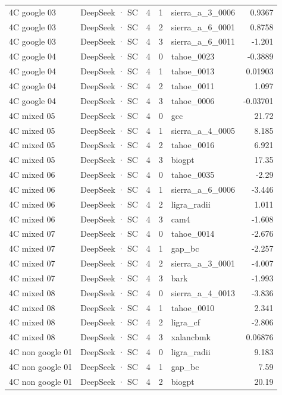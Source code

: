 \begin{tabular}{llrrlr}
4C google 03 & DeepSeek · SC & 4 & 1 & sierra\_a\_3\_0006 & 0.9367 \\
4C google 03 & DeepSeek · SC & 4 & 2 & sierra\_a\_6\_0001 & 0.8758 \\
4C google 03 & DeepSeek · SC & 4 & 3 & sierra\_a\_6\_0011 & -1.201 \\
4C google 04 & DeepSeek · SC & 4 & 0 & tahoe\_0023 & -0.3889 \\
4C google 04 & DeepSeek · SC & 4 & 1 & tahoe\_0013 & 0.01903 \\
4C google 04 & DeepSeek · SC & 4 & 2 & tahoe\_0011 & 1.097 \\
4C google 04 & DeepSeek · SC & 4 & 3 & tahoe\_0006 & -0.03701 \\
4C mixed 05 & DeepSeek · SC & 4 & 0 & gcc & 21.72 \\
4C mixed 05 & DeepSeek · SC & 4 & 1 & sierra\_a\_4\_0005 & 8.185 \\
4C mixed 05 & DeepSeek · SC & 4 & 2 & tahoe\_0016 & 6.921 \\
4C mixed 05 & DeepSeek · SC & 4 & 3 & biogpt & 17.35 \\
4C mixed 06 & DeepSeek · SC & 4 & 0 & tahoe\_0035 & -2.29 \\
4C mixed 06 & DeepSeek · SC & 4 & 1 & sierra\_a\_6\_0006 & -3.446 \\
4C mixed 06 & DeepSeek · SC & 4 & 2 & ligra\_radii & 1.011 \\
4C mixed 06 & DeepSeek · SC & 4 & 3 & cam4 & -1.608 \\
4C mixed 07 & DeepSeek · SC & 4 & 0 & tahoe\_0014 & -2.676 \\
4C mixed 07 & DeepSeek · SC & 4 & 1 & gap\_bc & -2.257 \\
4C mixed 07 & DeepSeek · SC & 4 & 2 & sierra\_a\_3\_0001 & -4.007 \\
4C mixed 07 & DeepSeek · SC & 4 & 3 & bark & -1.993 \\
4C mixed 08 & DeepSeek · SC & 4 & 0 & sierra\_a\_4\_0013 & -3.836 \\
4C mixed 08 & DeepSeek · SC & 4 & 1 & tahoe\_0010 & 2.341 \\
4C mixed 08 & DeepSeek · SC & 4 & 2 & ligra\_cf & -2.806 \\
4C mixed 08 & DeepSeek · SC & 4 & 3 & xalancbmk & 0.06876 \\
4C non google 01 & DeepSeek · SC & 4 & 0 & ligra\_radii & 9.183 \\
4C non google 01 & DeepSeek · SC & 4 & 1 & gap\_bc & 7.59 \\
4C non google 01 & DeepSeek · SC & 4 & 2 & biogpt & 20.19 \\

\end{tabular}
